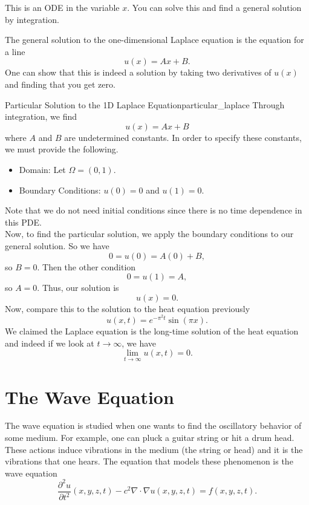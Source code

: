         \begin{exercise}
        This is an ODE in the variable $x$.  You can solve this and find a general solution by integration.  
        \end{exercise} 
        
        \begin{answer}
        The general solution to the one-dimensional Laplace equation is the equation for a line
        \[
        u(x) = Ax+B.
        \]
        One can show that this is indeed a solution by taking two derivatives of $u(x)$ and finding that you get zero.
        \end{answer}
        
        \begin{ex}{Particular Solution to the 1D Laplace Equation}{particular_laplace}
        Through integration, we find
        \[
        u(x) = Ax+B
        \]
        where $A$ and $B$ are undetermined constants.  In order to specify these constants, we must provide the following.
        \begin{itemize}
            \item Domain: Let $\Omega = (0,1)$.
            \item Boundary Conditions: $u(0)=0$ and $u(1)=0$.  
        \end{itemize}
        Note that we do not need initial conditions since there is no time dependence in this PDE.\\
        
        Now, to find the particular solution, we apply the boundary conditions to our general solution.  So we have
        \[
        0=u(0)=A(0)+B,
        \]
        so $B=0$.  Then the other condition 
        \[
        0=u(1)=A,
        \]
        so $A=0$.  Thus, our solution is
        \[
        \boxed{u(x)=0}.
        \]
        Now, compare this to the solution to the heat equation previously
        \[
        u(x,t)=e^{-\pi^2 t}\sin(\pi x).
        \]
        We claimed the Laplace equation is the long-time solution of the heat equation and indeed if we look at $t\to\infty$, we have
        \[
        \lim_{t\to \infty} u(x,t)=0.
        \]
        \end{ex}
        

        \section{The Wave Equation}
        The wave equation is studied when one wants to find the oscillatory behavior of some medium.  For example, one can pluck a guitar string or hit a drum head.  These actions induce vibrations in the medium (the string or head) and it is the vibrations that one hears.  The equation that models these phenomenon is the wave equation
        \[
        \frac{\partial^2 u}{\partial t^2}(x,y,z,t)-c^2 \nabla \cdot \nabla u(x,y,z,t)=f(x,y,z,t).
        \]
        
